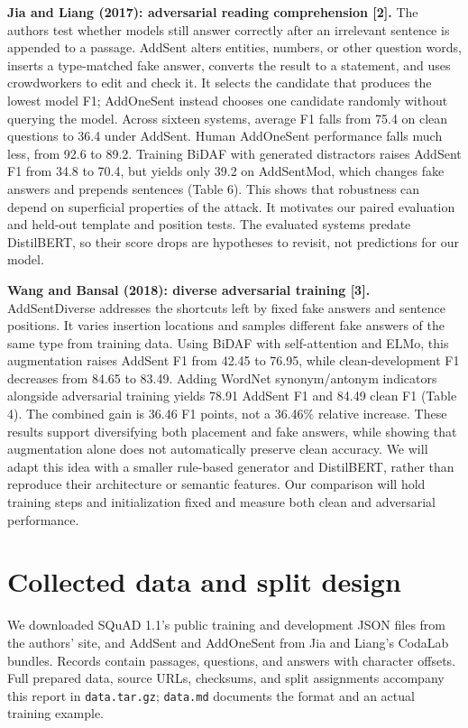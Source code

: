 \documentclass[11pt,letterpaper]{article}
\begin{document}
\textbf{Jia and Liang (2017): adversarial reading comprehension [2].}
The authors test whether models still answer correctly after an irrelevant sentence is appended to a passage. AddSent alters entities, numbers, or other question words, inserts a type-matched fake answer, converts the result to a statement, and uses crowdworkers to edit and check it. It selects the candidate that produces the lowest model F1; AddOneSent instead chooses one candidate randomly without querying the model. Across sixteen systems, average F1 falls from 75.4 on clean questions to 36.4 under AddSent. Human AddOneSent performance falls much less, from 92.6 to 89.2. Training BiDAF with generated distractors raises AddSent F1 from 34.8 to 70.4, but yields only 39.2 on AddSentMod, which changes fake answers and prepends sentences (Table 6). This shows that robustness can depend on superficial properties of the attack. It motivates our paired evaluation and held-out template and position tests. The evaluated systems predate DistilBERT, so their score drops are hypotheses to revisit, not predictions for our model.

\textbf{Wang and Bansal (2018): diverse adversarial training [3].}
AddSentDiverse addresses the shortcuts left by fixed fake answers and sentence positions. It varies insertion locations and samples different fake answers of the same type from training data. Using BiDAF with self-attention and ELMo, this augmentation raises AddSent F1 from 42.45 to 76.95, while clean-development F1 decreases from 84.65 to 83.49. Adding WordNet synonym/antonym indicators alongside adversarial training yields 78.91 AddSent F1 and 84.49 clean F1 (Table 4). The combined gain is 36.46 F1 points, not a 36.46\% relative increase. These results support diversifying both placement and fake answers, while showing that augmentation alone does not automatically preserve clean accuracy. We will adapt this idea with a smaller rule-based generator and DistilBERT, rather than reproduce their architecture or semantic features. Our comparison will hold training steps and initialization fixed and measure both clean and adversarial performance.

\newpage
\section*{Collected data and split design}
We downloaded SQuAD 1.1's public training and development JSON files from the authors' site, and AddSent and AddOneSent from Jia and Liang's CodaLab bundles. Records contain passages, questions, and answers with character offsets. Full prepared data, source URLs, checksums, and split assignments accompany this report in \texttt{data.tar.gz}; \texttt{data.md} documents the format and an actual training example.
\end{document}

